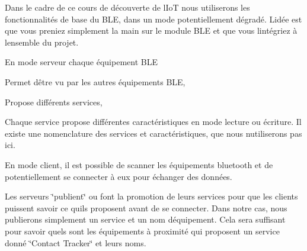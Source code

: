 Dans le cadre de ce cours de découverte de l\textquotesingle{}IoT nous utiliserons les fonctionnalités de base du BLE, dans un mode potentiellement dégradé. L\textquotesingle{}idée est que vous preniez simplement la main sur le module BLE et que vous l\textquotesingle{}intégriez à l\textquotesingle{}ensemble du projet.

En mode serveur chaque équipement BLE
\begin{DoxyItemize}
\item Permet d\textquotesingle{}être vu par les autres équipements BLE,
\item Propose différents services,
\item Chaque service propose différentes caractéristiques en mode lecture ou écriture. Il existe une nomenclature des services et caractéristiques, que nous n\textquotesingle{}utiliserons pas ici.
\end{DoxyItemize}



En mode client, il est possible de scanner les équipements bluetooth et de potentiellement se connecter à eux pour échanger des données.

Les serveurs \char`\"{}publient\char`\"{} ou font la promotion de leurs services pour que les clients puissent savoir ce qu\textquotesingle{}ils proposent avant de se connecter. Dans notre cas, nous publierons simplement un service et un nom d\textquotesingle{}équipement. Cela sera suffisant pour savoir quels sont les équipements à proximité qui proposent un service donné \char`\"{}\+Contact Tracker\char`\"{} et leurs noms. 